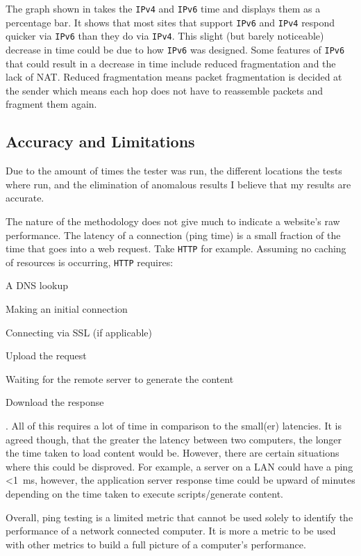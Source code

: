 \documentclass[a4paper]{article}
\def \IPF {\texttt{IPv4}}
\def \IPS {\texttt{IPv6}}
\begin{document}
The graph shown in  takes the {\IPF} and {\IPS} time and displays them as a percentage bar.
It shows that most sites that support {\IPS} and {\IPF} respond quicker via {\IPS} than they do via {\IPF}.
This slight (but barely noticeable) decrease in time could be due to how {\IPS} was designed.
Some features of {\IPS} that could result in a decrease in time include reduced fragmentation and the lack of NAT.
Reduced fragmentation means packet fragmentation is decided at the sender which means each hop does not have to reassemble packets and fragment them again.

\subsection*{Accuracy and Limitations}
Due to the amount of times the tester was run, the different locations the tests where run, and the elimination of anomalous results I believe that my results are accurate.

The nature of the methodology does not give much to indicate a website's raw performance.
The latency of a connection (ping time) is a small fraction of the time that goes into a web request.
Take \texttt{HTTP} for example. Assuming no caching of resources is occurring, \texttt{HTTP} requires:
\begin{enumerate*}
  \item A DNS lookup
  \item Making an initial connection
  \item Connecting via SSL (if applicable)
  \item Upload the request
  \item Waiting for the remote server to generate the content
  \item Download the response
\end{enumerate*}.
All of this requires a lot of time in comparison to the small(er) latencies.
It is agreed though, that the greater the latency between two computers, the longer the time taken to load content would be.
However, there are certain situations where this could be disproved.
For example, a server on a LAN could have a ping \textless \SI{1}{\milli\second}, however, the application server response time could be upward of minutes
depending on the time taken to execute scripts/generate content.

Overall, ping testing is a limited metric that cannot be used solely to identify the performance of a network connected computer.
It is more a metric to be used with other metrics to build a full picture of a computer's performance.
\end{document}
